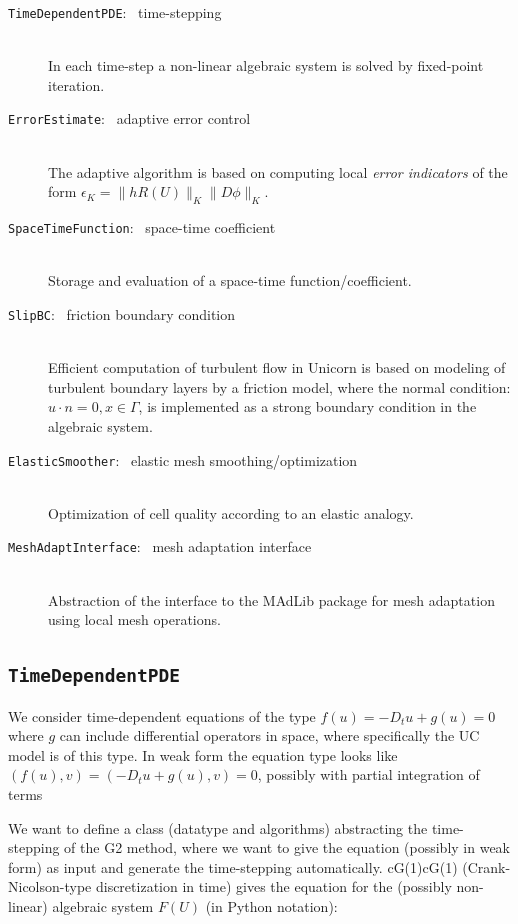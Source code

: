 \begin{description}
\item[{\tt TimeDependentPDE}: \ time-stepping]
\ \\
In each time-step a non-linear algebraic system is solved by
fixed-point iteration.
\item[{\tt ErrorEstimate}: \ adaptive error control]
\ \\
The adaptive algorithm is based on computing local {\em error
indicators} of the form $\epsilon_K = \|h R(U)\|_K \|D \phi\|_K$.

\item[{\tt SpaceTimeFunction}: \ space-time coefficient]
\ \\
Storage and evaluation of a space-time function/coefficient.
\item[{\tt SlipBC}: \ friction boundary condition]
\ \\
Efficient computation of turbulent flow in Unicorn is based on
modeling of turbulent boundary layers by a friction model, where the
normal condition: $u \cdot n = 0, x \in \Gamma$, is implemented as a
strong boundary condition in the algebraic system.
\item[{\tt ElasticSmoother}: \ elastic mesh smoothing/optimization]
\ \\
Optimization of cell quality according to an elastic analogy.
\item[{\tt MeshAdaptInterface}: \ mesh adaptation interface]
\ \\
Abstraction of the interface to the MAdLib package for mesh adaptation
using local mesh operations.
\end{description}

\subsection{\tt TimeDependentPDE}

We consider time-dependent equations of the type $f(u) = -D_t u + g(u)
= 0$ where $g$ can include differential operators in space, where
specifically the UC model is of this type. In weak form the equation
type looks like$(f(u), v) = (-D_t u + g(u), v) = 0$, possibly with
partial integration of terms

We want to define a class (datatype and algorithms) abstracting the
time-stepping of the G2 method, where we want to give the equation
(possibly in weak form) as input and generate the time-stepping
automatically. cG(1)cG(1) (Crank-Nicolson-type discretization in time)
gives the equation for the (possibly non-linear) algebraic system
$F(U)$ (in Python notation):


